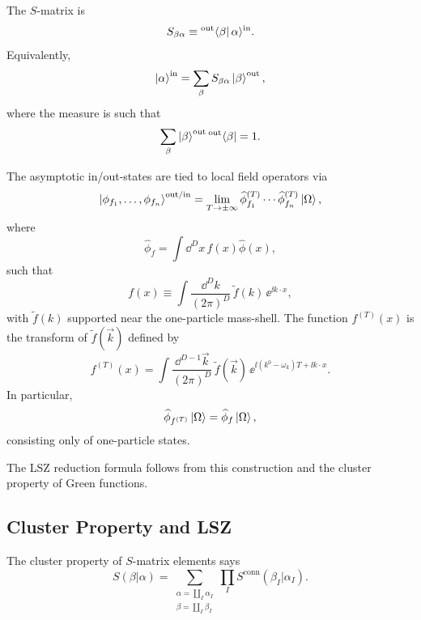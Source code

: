 \begin{center}
\end{center}

The \(S\)-matrix is
\[
  S_{\beta\alpha}\equiv{}^{\mathrm{out}}\!\bra{\beta}\alpha\rangle^{\mathrm{in}}.
\]
Equivalently,
\[
  \ket{\alpha}^{\mathrm{in}}
  =
  \sum_{\beta}S_{\beta\alpha}\ket{\beta}^{\mathrm{out}},
\]
where the measure is such that
\[
  \sum_{\beta}\ket{\beta}^{\mathrm{out}}{}^{\mathrm{out}}\!\bra{\beta}=1.
\]

The asymptotic in/out-states are tied to local field operators via
\[
  \ket{\phi_{f_1},\ldots,\phi_{f_n}}^{\mathrm{out/in}}
  =
  \lim_{T\to\pm\infty}
  \widehat\phi_{f_1}^{(T)}\cdots
  \widehat\phi_{f_n}^{(T)}\ket{\Omega},
\]
where
\[
  \widehat\phi_f=\int \dd^D x\,f(x)\widehat\phi(x),
\]
such that
\[
  f(x)\equiv
  \int \frac{\dd^D k}{(2\pi)^D}\,\widetilde f(k)\,\ee^{\ii k\cdot x},
\]
with \(\widetilde f(k)\) supported near the one-particle mass-shell.
The function \(f^{(T)}(x)\) is the transform of \(\widetilde f(\vec k)\)
defined by
\[
  f^{(T)}(x)
  =
  \int \frac{\dd^{D-1}\vec k}{(2\pi)^D}\,
  \widetilde f(\vec k)\,
  \ee^{\ii(k^0-\omega_k)T+\ii k\cdot x}.
\]
In particular,
\[
  \widehat\phi_{f^{(T)}}\ket{\Omega}
  =
  \widehat\phi_f\ket{\Omega},
\]
consisting only of one-particle states.

The LSZ reduction formula follows from this construction and the cluster
property of Green functions.

\subsection{Cluster Property and LSZ}

The cluster property of \(S\)-matrix elements says
\[
  S(\beta|\alpha)
  =
  \sum_{\substack{\alpha=\coprod_I\alpha_I\\ \beta=\coprod_I\beta_I}}
  \prod_I S^{\mathrm{conn}}(\beta_I|\alpha_I).
\]

